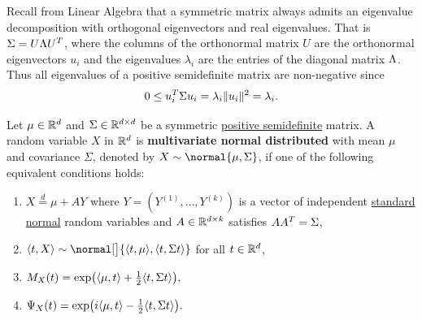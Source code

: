 \begin{remark}
    Recall from Linear Algebra that a symmetric matrix always admits an
    eigenvalue decomposition with orthogonal eigenvectors and real eigenvalues.
    That is \(\Sigma = U \Lambda U^T\), where the columns of
    the orthonormal matrix \(U\) are the orthonormal eigenvectors \(u_i\) and
    the eigenvalues \(\lambda_i\) are the entries of the diagonal matrix
    \(\Lambda\). Thus all eigenvalues of a positive semidefinite matrix
    are non-negative since
    \[
        0\le u_i^T \Sigma u_i = \lambda_i \|u_i\|^2 = \lambda_i.
    \]
\end{remark}

\begin{definition}
    \label{def: multivariate normal distribution}
    Let \(\mu\in \mathbb{R}^d\) and \(\Sigma \in \mathbb{R}^{d \times d}\)
    be a symmetric \underline{positive semidefinite} matrix.
    A random variable \(X\) in \(\mathbb{R}^d\) is \textbf{multivariate normal
    distributed} with mean \(\mu\) and covariance \(\Sigma\), denoted by \(X
    \sim \normal{\mu, \Sigma}\), if one of the following equivalent conditions
    holds:
    \begin{enumerate}[label=(\roman*), noitemsep]
        \item\label{it: multivariate standard normal} \(X \overset{d}= \mu + A
        Y\) where \(Y=(Y^{(1)}, \ldots, Y^{(k)})\) is a vector of
        independent \underline{standard normal} random variables and
        \(A\in \mathbb{R}^{d\times k}\) satisfies \(A A^T = \Sigma\),

        \item\label{it: multivariate linear normal}
        \(\scp{t, X} \sim \normal[\big]{\scp{t, \mu}, \scp{t, \Sigma t}}\)
        for all \(t\in \mathbb{R}^d\),

        \item\label{it: multivariate mgf normal}
        \(
            M_X(t)
            = \exp\bigl(\langle\mu, t\rangle + \tfrac12 \langle t, \Sigma t\rangle\bigr),
        \)

        \item\label{it: multivariate char fct normal}
        \(
            \Psi_X(t)
            = \exp\bigl(i \langle\mu, t\rangle - \tfrac12 \langle t, \Sigma t\rangle\bigr).
        \)
    \end{enumerate}
\end{definition}

